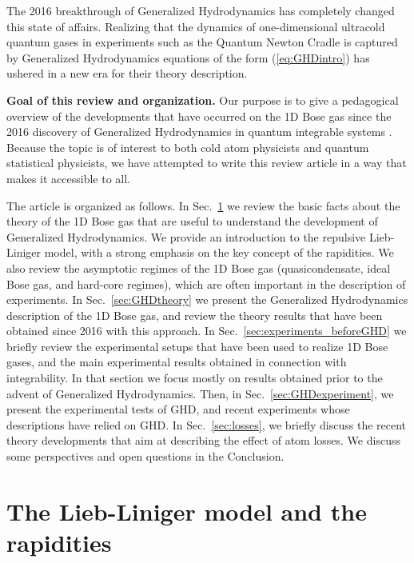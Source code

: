 \documentclass[onecolumn,amsfonts,showpacs,superscriptaddress]{revtex4-1}
\begin{document}
The 2016 breakthrough of Generalized Hydrodynamics has completely changed this state of affairs. Realizing that the dynamics of one-dimensional ultracold quantum gases in experiments such as the Quantum Newton Cradle is captured by Generalized Hydrodynamics equations of the form (\ref{eq:GHDintro}) has ushered in a new era for their theory description.



\vspace{1cm}


{\bf Goal of this review and organization.} Our purpose is to 
give a pedagogical overview of the developments that have occurred on the 1D Bose gas since the 2016 discovery of Generalized Hydrodynamics in quantum integrable systems \citep{castro2016emergent,bertini2016transport}. Because the topic is of interest to both cold atom physicists and quantum statistical physicists, we have attempted to write this review article in a way that makes it accessible to all.


The article is organized as follows. In Sec.~\ref{sec:LiebLiniger} we review the basic facts about the theory of the 1D Bose gas that are useful to understand the development of Generalized Hydrodynamics. We provide an introduction to the repulsive Lieb-Liniger model, with a strong emphasis on the key concept of the rapidities. We also review the asymptotic regimes of the 1D Bose gas (quasicondensate, ideal Bose gas, and hard-core regimes),  which are often important in the description of experiments.
In Sec.~\ref{sec:GHDtheory} we present the Generalized Hydrodynamics description of the 1D Bose gas, and review the theory results that have been obtained since 2016 with this approach. In Sec.~\ref{sec:experiments_beforeGHD} we briefly review the experimental setups that have been used to realize 1D Bose gases, and the main experimental results obtained in connection with integrability. In that section we focus mostly on results obtained prior to the advent of Generalized Hydrodynamics. Then, in Sec.~\ref{sec:GHDexperiment}, we present the experimental tests of GHD, and recent experiments whose descriptions have relied on GHD. In  Sec.~\ref{sec:losses}, we briefly discuss the recent theory developments that aim at describing the effect of atom losses. We discuss some perspectives and open questions in the Conclusion.



\tableofcontents


\newpage

\section{The Lieb-Liniger model and the rapidities}
\label{sec:LiebLiniger}
\end{document}
